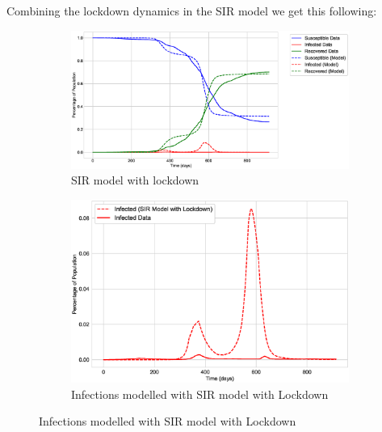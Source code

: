 \documentclass[tikz,fleqn,12pt]{wlscirep}
\begin{document}
Combining the lockdown dynamics in the SIR model we get this following:
\begin{figure}[H]
  \centering
  \caption{SIR Model with lockdown for India}
  \begin{subfigure}[t]{0.48\textwidth}
    \centering
    \includegraphics[width=\linewidth]{images/SIR_model_with_lockdown_IND.eps}
    \caption{SIR model with lockdown}
  \end{subfigure}
  \label{fig:SIR_model_with_lockdown_IND}
  \hfill
  \begin{subfigure}[t]{0.48\textwidth}
    \centering
    \includegraphics[scale=0.25]{images/SIR_model_with_lockdown_infections_IND.eps}
    \caption{Infections modelled with SIR model with Lockdown}
  \end{subfigure}
  \label{fig:SIR_model_with_lockdown_infections_IND}
\end{figure}
\end{document}
